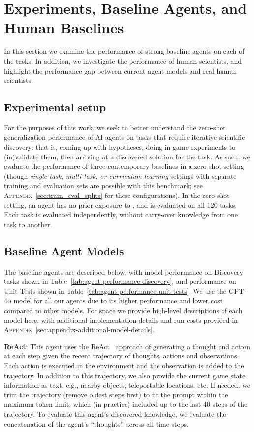 \section{Experiments, Baseline Agents, and Human Baselines}

In this section we examine the performance of strong baseline agents on each of the \env tasks.  In addition, we investigate the performance of human scientists, and highlight the performance gap between current agent models and real human scientists. 

\subsection{Experimental setup}

For the purposes of this work, we seek to better understand the zero-shot generalization performance of AI agents on tasks that require iterative scientific discovery: that is, coming up with hypotheses, doing in-game experiments to (in)validate them, then arriving at a discovered solution for the task.  As such, we evaluate the performance of three contemporary baselines in a zero-shot setting (though \textit{single-task, multi-task, or curriculum learning} settings with separate training and evaluation sets are possible with this benchmark; see \textsc{Appendix}~\ref{sec:train_eval_splits} for these configurations).  In the zero-shot setting, an agent has no prior exposure to \env, and is evaluated on all 120 tasks.  Each task is evaluated independently, without carry-over knowledge from one task to another. 



\subsection{Baseline Agent Models}

The baseline agents are described below, with model performance on Discovery tasks shown in Table~\ref{tab:agent-performance-discovery}, and performance on Unit Tests shown in Table~\ref{tab:agent-performance-unit-tests}. We use the \textsc{GPT-4o} model for all our agents due to its higher performance and lower cost compared to other models.  For space we provide high-level descriptions of each model here,  with additional implementation details and run costs provided in \textsc{Appendix}~\ref{sec:appendix-additional-model-details}. 

\textbf{ReAct}: This agent uses the ReAct~\cite{Yao2022ReActSR} approach of generating a thought and action at each step given the recent trajectory of thoughts, actions and observations. Each action is executed in the environment and the observation is added to the trajectory. In addition to this trajectory, we also provide the current game state information as text, e.g., nearby objects, teleportable locations, etc. If needed, we trim the trajectory (remove oldest steps first) to fit the prompt within the maximum token limit, which (in practice) included up to the last 40 steps of the trajectory. %
To evaluate this agent's discovered knowledge, we evaluate the concatenation of the agent's ``thoughts'' across all time steps.

